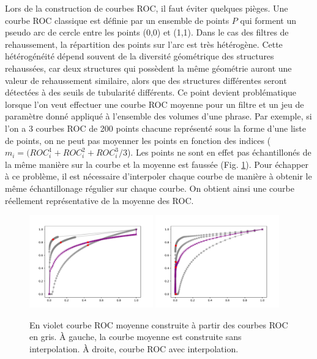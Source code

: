 Lors de la construction de courbes ROC, il faut éviter quelques pièges. Une courbe ROC classique est définie par un ensemble de points $P$ qui forment un pseudo arc de cercle entre les points (0,0) et (1,1). Dans le cas des filtres de rehaussement, la répartition des points sur l'arc est très hétérogène. Cette hétérogénéité dépend souvent de la diversité géométrique des structures rehaussées, car deux structures qui possèdent la même géométrie auront une valeur de rehaussement similaire, alors que des structures différentes seront détectées à des seuils de tubularité différents. Ce point devient problématique lorsque l'on veut effectuer une courbe ROC moyenne pour un filtre et un jeu de paramètre donné appliqué à l'ensemble des volumes d'une phrase. Par exemple, si l'on a 3 courbes ROC de 200 points chacune représenté sous la forme d'une liste de points, on ne peut pas moyenner les points en fonction des indices ( $m_i = (ROC^1_{i} + ROC^2_{i} + ROC^3_{i}/3 $). Les points ne sont en effet pas échantillonés de la même manière sur la courbe et la moyenne est faussée (Fig. \ref{fig:good_and_bad_roc}). Pour échapper à ce problème, il est nécessaire d'interpoler chaque courbe de manière à obtenir le même échantillonage régulier sur chaque courbe. On obtient ainsi une courbe réellement représentative de la moyenne des ROC.


\begin{figure}[ht]
  \centering
  \includegraphics[height=4cm]{Images/ROC_badMean.pdf}
  \includegraphics[height=4cm]{Images/ROC_goodMean.pdf}
  \caption{En violet courbe ROC moyenne construite à partir des courbes ROC en gris. À gauche, la courbe moyenne est construite sans interpolation. À droite, courbe ROC avec interpolation.}
  \label{fig:good_and_bad_roc}
\end{figure}

